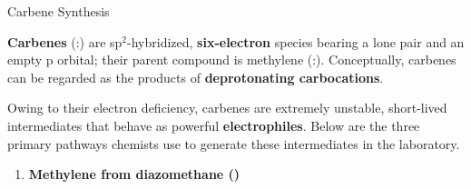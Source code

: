 \documentclass[10pt]{article}
\begin{document}
      \begin{core}[label=core:carbene_synthesis]{Carbene Synthesis}

        \textbf{Carbenes} (:) are sp$^2$-hybridized, \textbf{six-electron} species bearing a lone pair and an empty p orbital; their parent compound is methylene (:). Conceptually, carbenes can be regarded as the products of \textbf{deprotonating carbocations}.


        Owing to their electron deficiency, carbenes are extremely unstable, short-lived intermediates that behave as powerful \textbf{electrophiles}. Below are the three primary pathways chemists use to generate these intermediates in the laboratory.

        \begin{enumerate}

          \item \textbf{Methylene from diazomethane ()}



\end{enumerate}
\end{core}
\end{document}
